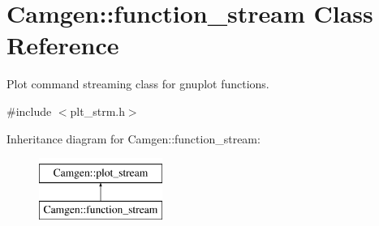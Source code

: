 \hypertarget{a00235}{}\section{Camgen\+:\+:function\+\_\+stream Class Reference}
\label{a00235}


Plot command streaming class for gnuplot functions.  




{\ttfamily \#include $<$plt\+\_\+strm.\+h$>$}

Inheritance diagram for Camgen\+:\+:function\+\_\+stream\+:\begin{figure}[H]
\begin{center}
\leavevmode
\includegraphics[height=2.000000cm]{a00235}
\end{center}
\end{figure}
